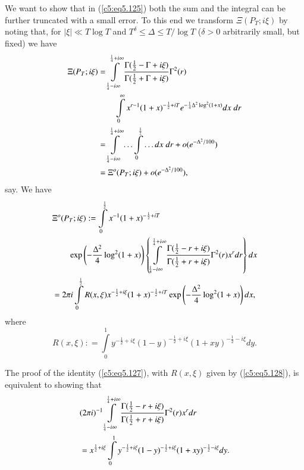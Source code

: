 We want to show that in (\ref{c5:eq5.125}) both the sum and the
integral can be further truncated with a small error. To this end we
transform $\Xi (P_T;i\xi)$ by noting that, for $|\xi| \ll T \log T$
and $T^\delta \leq \Delta \leq T /\log T$ ($\delta > 0$ arbitrarily
small, but fixed) we have  
\begin{align}
\Xi (P_T ; i\xi)  &= \int\limits^{\frac{1}{4} + i \infty}_{\frac{1}{4}
  - i \infty} \frac{\Gamma (\frac{1}{2} -\Gamma + i \xi)}{ \Gamma
  (\frac{1}{2} + \Gamma + i \xi)} \Gamma^2 (r)\notag\\
&\qquad \int\limits^\infty_0
x^{r-1} (1+x)^{-\frac{1}{2} + iT}  e^{-\frac{1}{4} \Delta^2 \log^2
  (1+x)} dx \; dr\label{c5:eq5.126}\\ 
&= \int\limits^{\frac{1}{4} + i \infty}_{\frac{1}{4} - i \infty} \ldots
\int\limits^{\frac{1}{2}}_0 \ldots dx \; dr  + o(e^{-\Delta^2/
  100})\notag\\  
&=\Xi^o (P_T;i\xi) + o(e^{-\Delta^2/100}), \notag
\end{align}
say. We have
\begin{align}
& \Xi^o (P_T ; i\xi) : 
 = \int\limits^{\frac{1}{2}}_0 x^{-1} (1+x)^{-\frac{1}{2} + iT}
 \label{c5:eq5.127}\\ 
& \qquad \exp \left(-\frac{\Delta^2}{4} \log^2 (1+x)\right) \left\{\int\limits^{\frac{1}{4} + i \infty}_{\frac{1}{4} - i \infty}
 \frac{\Gamma (\frac{1}{2} - r + i\xi)}{\Gamma (\frac{1}{2} + r+ i
   \xi)} \Gamma^2 (r) x^r dr\right\} dx\notag\\ 
& = 2\pi i \int\limits^{\frac{1}{2}}_0 R(x,\xi) x^{-\frac{1}{2} + i
   \xi} (1+x)^{-\frac{1}{2} + iT} \exp \left(-\frac{\Delta^2}{4}
 \log^2 (1+x) \right) dx,\notag 
\end{align}\pageoriginale
where 
\begin{equation}
R (x,\xi) : = \int\limits^1_0 y^{-\frac{1}{2} + i\xi} (1-y)^{-\frac{1}{2} + i\xi} (1+ xy)^{-\frac{1}{2} - i\xi} dy.\label{c5:eq5.128}
\end{equation}

The proof of the identity (\ref{c5:eq5.127}), with $R(x,\xi)$ given by
(\ref{c5:eq5.128}), is equivalent to showing that  
\begin{align}
& (2\pi i)^{-1} \int\limits^{\frac{1}{4} + i \infty}_{\frac{1}{4} - i
    \infty} \frac{\Gamma (\frac{1}{2} -  r + i \xi)}{\Gamma
    (\frac{1}{2} + r + i \xi)} \Gamma^2 (r) x^r dr  
\label{c5:eq5.129}\\
& = x^{\frac{1}{2} + i \xi} \int\limits^1 _0 y^{-\frac{1}{2} + i \xi} (1-y)^{-\frac{1}{2} + i \xi} (1+ xy)^{-\frac{1}{2} - i \xi} dy.\notag
\end{align}

